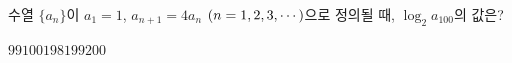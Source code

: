 \hspace*{2mm}\begin{minipage}[t]{\dimexpr\linewidth-2mm\relax}\vspace{0pt}
수열 $\{a_n\}$이 $a_1=1$, $a_{n+1}=4a_n$ $(n=1{,}\mkern3mu\mathopen{}2{,}\mkern3mu\mathopen{}3{,}\mkern3mu\mathopen{}\cdots)$으로 정의될 때, $\log_2 a_{100}$의 값은?
\begin{choices32}{$99$}{$100$}{$198$}{$199$}{$200$}\end{choices32}\end{minipage}
